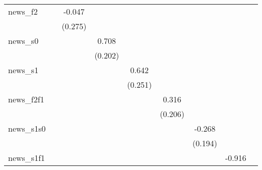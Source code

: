 {\begin{tabular}{l*{8}{c}}
\addlinespace
news\_f2     &                     &      -0.047         &                     &                     &                     &                     &                     &                     \\
            &                     &     (0.275)         &                     &                     &                     &                     &                     &                     \\
\addlinespace
news\_s0     &                     &                     &       0.708\sym{***}&                     &                     &                     &                     &                     \\
            &                     &                     &     (0.202)         &                     &                     &                     &                     &                     \\
\addlinespace
news\_s1     &                     &                     &                     &       0.642\sym{**} &                     &                     &                     &                     \\
            &                     &                     &                     &     (0.251)         &                     &                     &                     &                     \\
\addlinespace
news\_f2f1   &                     &                     &                     &                     &       0.316         &                     &                     &                     \\
            &                     &                     &                     &                     &     (0.206)         &                     &                     &                     \\
\addlinespace
news\_s1s0   &                     &                     &                     &                     &                     &      -0.268         &                     &                     \\
            &                     &                     &                     &                     &                     &     (0.194)         &                     &                     \\
\addlinespace
news\_s1f1   &                     &                     &                     &                     &                     &                     &      -0.916\sym{**} &                     \\

\end{tabular}}
